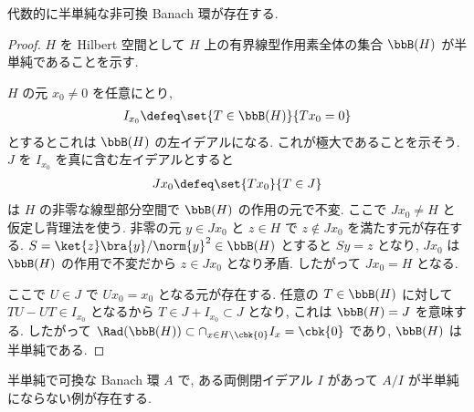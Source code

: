 \documentclass[openany, a4paper, oneside]{jsbook}
\begin{document}
\begin{ex}
代数的に半単純な非可換 Banach 環が存在する.
\end{ex}
\begin{proof}
$H$ を Hilbert 空間として $H$ 上の有界線型作用素全体の集合
$\bbB (H)$ が半単純であることを示す.

$H$ の元 $x_0 \neq 0$ を任意にとり,
\begin{align}
 I_{x_0}
 \defeq
 \set{T \in \bbB(H)}{T x_0 = 0}
\end{align}
とするとこれは $\bbB (H)$ の左イデアルになる.
これが極大であることを示そう.
$J$ を $I_{x_0}$ を真に含む左イデアルとすると
\begin{align}
 J x_0
 \defeq
 \set{T x_0}{T \in J}
\end{align}
は $H$ の非零な線型部分空間で $\bbB(H)$ の作用の元で不変.
ここで $J x_0 \neq H$ と仮定し背理法を使う.
非零の元 $y \in J x_0$ と $z \in H$ で $z \notin J x_0$ を満たす元が存在する.
$S = \ket{z} \bra{y} / \norm{y}^2 \in \bbB(H)$ とすると $Sy = z$ となり,
$J x_0$ は $\bbB(H)$ の作用で不変だから $z \in J x_{0}$ となり矛盾.
したがって $J x_0 = H$ となる.

ここで $U \in J$ で $U x_0 = x_0$ となる元が存在する.
任意の $T \in \bbB(H)$ に対して $TU - UT \in I_{x_0}$ となるから
$T \in J + I_{x_0} \subset J$ となり, これは $\bbB (H) = J$ を意味する.
したがって $\Rad (\bbB(H)) \subset \cap_{x \in H \setminus \cbk{0}} I_x = \cbk{0}$ であり,
$\bbB(H)$ は半単純である.
\end{proof}

\begin{ex}
半単純で可換な Banach 環 $A$ で,
ある両側閉イデアル $I$ があって $A/I$ が半単純にならない例が存在する.
\end{ex}
\end{document}

